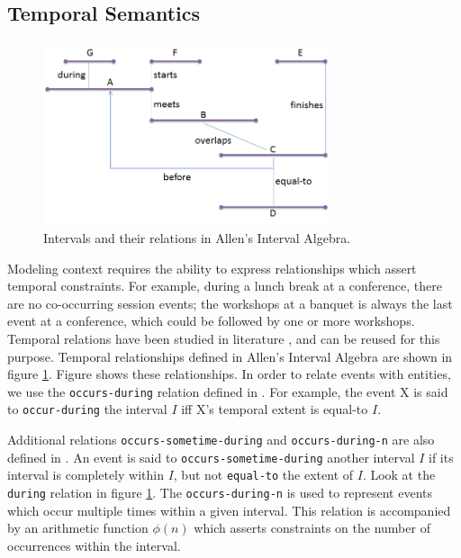 \subsection{Temporal Semantics}

\begin{figure}[t]
\centering
\includegraphics[width=0.75\textwidth]{media/chapter2/allen.png}
\caption{Intervals and their relations in Allen's Interval Algebra.}
\label{fig:allen}
\end{figure}

Modeling context requires the ability to express relationships which assert temporal constraints. For example, during a lunch break at a conference, there are no co-occurring session events; the workshops at a banquet is always the last event at a conference, which could be followed by one or more workshops. Temporal relations have been studied in literature \cite{allen1983maintaining, wolter2000spatio}, and can be reused for this purpose. Temporal relationships defined in Allen's Interval Algebra are shown in figure \ref{fig:allen}. Figure shows these relationships. In order to relate events with entities, we use the \texttt{occurs-during} relation defined in \cite{gupta2011managing}. For example, the event X is said to \texttt{occur-during} the interval $I$ iff X's temporal extent is equal-to $I$. 

Additional relations \texttt{occurs-sometime-during} and \texttt{occurs-during-n} are also defined in \cite{gupta2011managing}. An event is said to \texttt{occurs-sometime-during} another interval $I$ if its interval is completely within $I$, but not \texttt{equal-to} the extent of $I$. Look at the \texttt{during} relation in figure \ref{fig:allen}. The \texttt{occurs-during-n} is used to represent events which occur multiple times within a given interval. This relation is accompanied by an arithmetic function $\phi(n)$ which asserts constraints on the number of occurrences within the interval.

